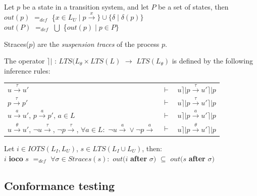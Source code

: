 \documentclass[a4paper]{report}
\begin{document}
\begin{definition}
Let $p$ be a state in a transition system, and let $P$ be a set of states, then\\
\newline
$out(p)$ $=_{def}$ \{$x\in L_U \mid p \xrightarrow{x} \} \cup \{ \delta \mid \delta (p) \}$\\
\newline
$out(P)$ $=_{def}$ $ \bigcup$ \{$out(p) \mid p \in P \}$\\
\end{definition}

\begin{definition}
Straces($p$) are the \textit{suspension traces} of the process $p$.\\
\end{definition}

\begin{definition}
The operator $ \rceil \vert $ : $LTS(L_{\theta} \times LTS(L)$ $\rightarrow $ $ LTS(L_{\theta}) $ is defined by the following inference rules:\\

\begin{tabular}{lll}
   $u \xrightarrow{\tau} u'$ & $\vdash$ & $u \rceil \vert p \xrightarrow{\tau} u' \rceil \vert p$ \\
   $p \xrightarrow{\tau} p'$ & $\vdash$ & $u \rceil \vert p \xrightarrow{\tau} u' \rceil \vert p$ \\
   $u \xrightarrow{a} u'$, $p \xrightarrow{a} p'$, $a\in L$ & $\vdash$ & $u \rceil \vert p \xrightarrow{a} u' \rceil \vert p$ \\
   $u \xrightarrow{\theta} u'$, $\neg u \xrightarrow{\tau}$, $\neg p \xrightarrow{\tau}$, $\forall a \in L :$ $\neg u \xrightarrow{a} \vee \neg p \xrightarrow{a}$ & $\vdash$ & $u \rceil \vert p \xrightarrow{\theta} u' \rceil \vert p$ \\


\end{tabular}

\end{definition}

Let $i \in IOTS(L_I, L_U)$, $s \in LTS(L_I \cup L_U)$, then:\\
$i$ \textbf{ioco} $s$ $=_{def}$ $ \forall \sigma \in Straces(s): $ $out(i$ \textbf{after} $\sigma) $ $\subseteq$ $out(s$ \textbf{after} $\sigma) $\\




\subsection*{Conformance testing}
\end{document}
